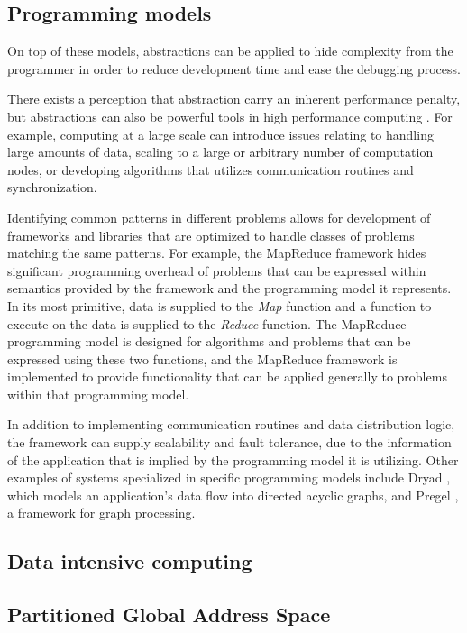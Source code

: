 \documentclass{uit-report}
\begin{document}
\subsection{Programming models}
On top of these models, abstractions can be applied to hide complexity from the programmer in order to reduce development time and ease the debugging process. 

There exists a perception that abstraction carry an inherent performance penalty, but abstractions can also be powerful tools in high performance computing \cite{mccandless_lumsdaine_1997}. For example, computing at a large scale can introduce issues relating to handling large amounts of data, scaling to a large or arbitrary number of computation nodes, or developing algorithms that utilizes communication routines and synchronization.

Identifying common patterns in different problems allows for development of frameworks and libraries that are optimized to handle classes of problems matching the same patterns. For example, the MapReduce framework hides significant programming overhead of problems that can be expressed within semantics provided by the framework and the programming model it represents. In its most primitive, data is supplied to the \emph{Map} function and a function to execute on the data is supplied to the \emph{Reduce} function. The MapReduce programming model is designed for algorithms and problems that can be expressed using these two functions, and the MapReduce framework is implemented to provide functionality that can be applied generally to problems within that programming model.

In addition to implementing communication routines and data distribution logic, the framework can supply scalability and fault tolerance, due to the information of the application that is implied by the programming model it is utilizing. Other examples of systems specialized in specific programming models include Dryad \cite{dryad}, which models an application's data flow into directed acyclic graphs, and Pregel \cite{pregel}, a framework for graph processing.

\subsection{Data intensive computing}



\subsection{Partitioned Global Address Space}
\cite{pgas_upc_energy}
\end{document}
